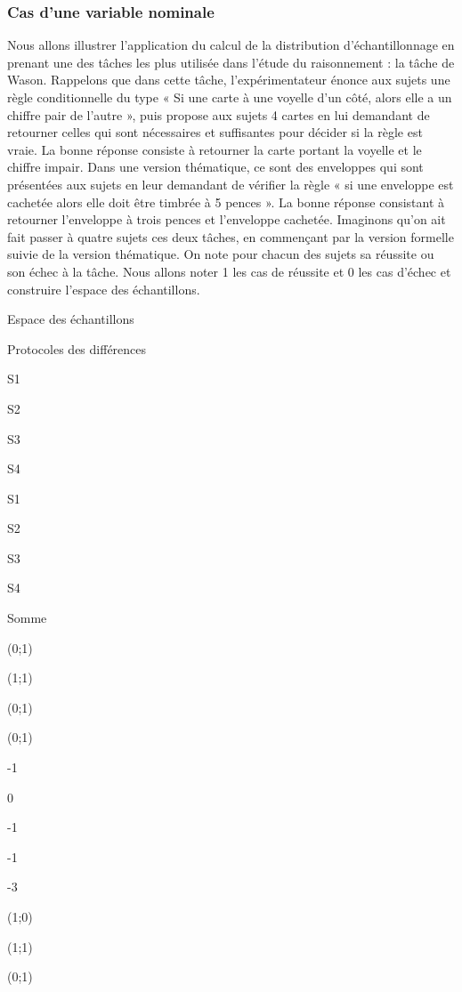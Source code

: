 \documentclass[]{book}
\theoremstyle{definition}
\theoremstyle{definition}
\theoremstyle{definition}
\theoremstyle{remark}
\begin{document}
\hypertarget{cas-dune-variable-nominale}{%
\subsubsection{Cas d'une variable
nominale}\label{cas-dune-variable-nominale}}

Nous allons illustrer l'application du calcul de la distribution
d'échantillonnage en prenant une des tâches les plus utilisée dans
l'étude du raisonnement : la tâche de Wason. Rappelons que dans cette
tâche, l'expérimentateur énonce aux sujets une règle conditionnelle du
type « Si une carte à une voyelle d'un côté, alors elle a un chiffre
pair de l'autre », puis propose aux sujets 4 cartes en lui demandant de
retourner celles qui sont nécessaires et suffisantes pour décider si la
règle est vraie. La bonne réponse consiste à retourner la carte portant
la voyelle et le chiffre impair. Dans une version thématique, ce sont
des enveloppes qui sont présentées aux sujets en leur demandant de
vérifier la règle « si une enveloppe est cachetée alors elle doit être
timbrée à 5 pences ». La bonne réponse consistant à retourner
l'enveloppe à trois pences et l'enveloppe cachetée. Imaginons qu'on ait
fait passer à quatre sujets ces deux tâches, en commençant par la
version formelle suivie de la version thématique. On note pour chacun
des sujets sa réussite ou son échec à la tâche. Nous allons noter 1 les
cas de réussite et 0 les cas d'échec et construire l'espace des
échantillons.

Espace des échantillons

Protocoles des différences

S1

S2

S3

S4

S1

S2

S3

S4

Somme

(0;1)

(1;1)

(0;1)

(0;1)

-1

0

-1

-1

-3

(1;0)

(1;1)

(0;1)
\end{document}
